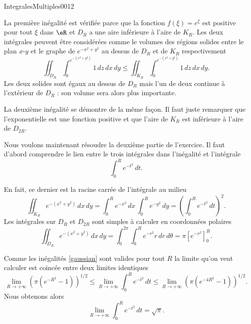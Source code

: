 \begin{corrige}{IntegralesMultiples0012}

 La première inégalité est vérifiée parce que la fonction $f(\xi)=e^\xi$ est positive pour tout $\xi $ dans $\eR$ et $D_R$ a une aire inférieure à l'aire de $K_R$. Les deux intégrales peuvent être considérées comme  le volumes des régions solides entre le plan $x$-$y$ et le graphe  de $e^{-x^2+y^2}$ au dessus de $D_R$ et de $K_R$ respectivement 
\begin{equation}
\iint_{D_R} \int_0^{e^{-(x^2+y^2)}} 1\, dz \, dx\, dy \leq \iint_{K_R} \int_0^{e^{-(x^2+y^2)}}1\,dz\, dx\, dy. 
\end{equation}
Les deux solides sont égaux au dessus de $D_R$ mais l'un de deux continue à l'extérieur de $D_R$ : son volume sera alors plus importante. 

La deuxième inégalité se démontre de la même façon. Il faut juste remarquer que l'exponentielle est une fonction positive et que l'aire de $K_R$ est inférieure à l'aire de $D_{2R}$.

Nous voulons maintenant résoudre la deuxième partie de l'exercice. Il faut d'abord comprendre le lien entre le trois intégrales dans l'inégalité et l'intégrale 
\[
\int_0^R e^{-t^2}\,dt.
\] 

En fait, ce dernier est la racine carrée de  l'intégrale au milieu 
\begin{equation}
 \iint_{K_R} e^{-(x^2+y^2)}\, dx\, dy =\int_0^Re^{-x^2}\,dx\,\int_0^Re^{-y^2}\,dy= \left(\int_0^Re^{-t^2}\,dt\right)^2.
\end{equation}
Les intégrales sur $D_R $ et $D_{2R}$ sont simples à calculer en coordonnées polaires 
\begin{equation}
  \iint_{D_R} e^{-(x^2+y^2)}\, dx\, dy =\int_{0}^{2\pi}\int_0^R e^{-r^2} r\, dr \, d\theta =\pi [e^{-r^2} ]_0^R.
\end{equation}

Comme les inégalités \eqref{gaussian} sont valides pour tout $R$ la limite qu'on veut calculer est coincée entre  deux limites identiques
\begin{equation}
  \lim_{R\to +\infty}\left(\pi(e^{-R^2}-1)\right)^{1/2}\leq \lim_{R\to +\infty}\int_0^Re^{-t^2}\,dt\leq \lim_{R\to +\infty}\left(\pi(e^{-4R^2}-1)\right)^{1/2}.
\end{equation}
Nous obtenons alors 
\begin{equation}
  \lim_{R\to +\infty}\int_0^Re^{-t^2}\,dt=\sqrt{\pi}.
\end{equation}
 \end{corrige}
